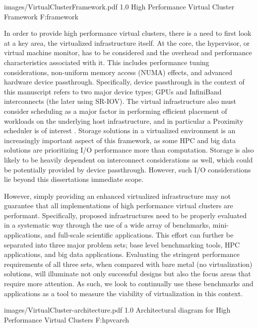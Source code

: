   {images/VirtualClusterFramework.pdf}
  {1.0}
  {High Performance Virtual Cluster Framework}
  {F:framework}

In order to provide high performance virtual clusters, there is a need to first look at a key area, the virtualized infrastructure itself. At the core, the hypervisor, or virtual machine monitor, has to be considered and the overhead and performance characteristics associated with it. This includes performance tuning considerations, non-uniform memory access (NUMA) effects, and advanced hardware device passthrough. Specifically, device passthrough in the context of this manuscript refers to two major device types; GPUs and InfiniBand interconnects (the later using SR-IOV). The virtual infrastructure also must consider scheduling as a major factor in performing efficient placement of workloads on the underlying host infrastructure, and in particular a Proximity scheduler is of interest \cite{www-proximity-scheduler}. Storage solutions in a virtualized environment is an increasingly important aspect of this framework, as some HPC and big data solutions are prioritizing I/O performance more than computation. Storage is also likely to be heavily dependent on interconnect considerations as well, which could be potentially provided by device passthrough. However, such I/O considerations lie beyond this dissertations immediate scope.  


However, simply providing an enhanced virtualized infrastructure may not guarantee that all implementations of high performance virtual clusters are performant. Specifically, proposed infrastructures need to be properly evaluated in a systematic way through the use of a wide array of benchmarks, mini-applications, and full-scale scientific applications. This effort can further be separated into three major problem sets; base level benchmarking tools, HPC applications, and big data applications. Evaluating the stringent performance requirements of all three sets, when compared with bare metal (no virtualization) solutions, will illuminate not only successful designs but also the focus areas that require more attention.  As such, we look to continually use these benchmarks and applications as a tool to measure the viability of virtualization in this context. 

  {images/VirtualCluster-architecture.pdf}
  {1.0}
  {Architectural diagram for High Performance Virtual Clusters}
  {F:hpvcarch}

